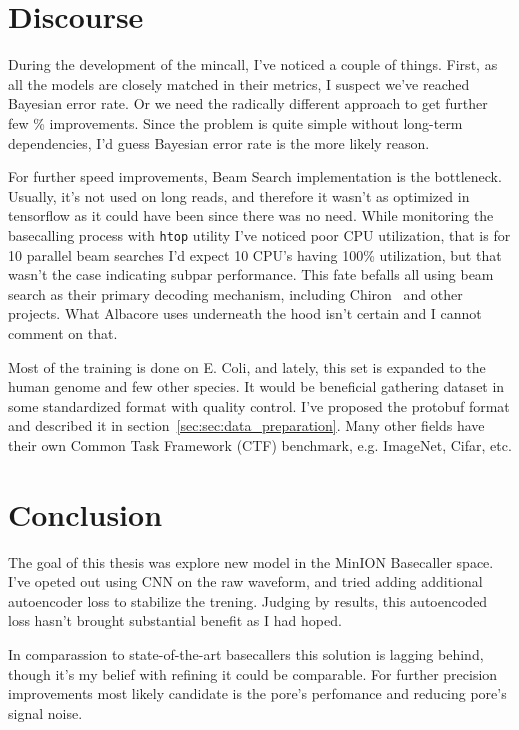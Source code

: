 \documentclass[times, utf8, diplomski, english]{fer}
\begin{document}
\chapter{Discourse}
\label{chap:discoure}
During the development of the mincall, I've noticed a couple of things. 
First, as all the models are closely matched in their metrics, I suspect we've reached Bayesian error rate. 
Or we need the radically different approach to get further few \% improvements. 
Since the problem is quite simple without long-term dependencies, I'd guess Bayesian error rate is the more likely reason.

For further speed improvements, Beam Search implementation is the bottleneck. 
Usually, it's not used on long reads, and therefore it wasn't as optimized in tensorflow as it could have been since there was no need. 
While monitoring the basecalling process with \texttt{htop} utility I've noticed poor CPU utilization, that is for 10 parallel beam searches I'd expect 10 CPU's having 100\% utilization, but that wasn't the case indicating subpar performance.
This fate befalls all using beam search as their primary decoding mechanism, including Chiron~\citep{chiron_teng} and other projects. 
What Albacore uses underneath the hood isn't certain and I cannot comment on that. 

Most of the training is done on E. Coli, and lately, this set is expanded to the human genome and few other species. 
It would be beneficial gathering dataset in some standardized format with quality control. 
I've proposed the protobuf format and described it in section~\ref{sec:sec:data_preparation}. 
Many other fields have their own Common Task Framework (CTF) benchmark, e.g. ImageNet, Cifar, etc. 
\chapter{Conclusion}
\label{chap:conslusion}

The goal of this thesis was explore new model in the MinION Basecaller space. 
I've opeted out using CNN on the raw waveform, and tried adding additional autoencoder loss to stabilize the trening. 
Judging by results, this autoencoded loss hasn't brought substantial benefit as I had hoped. 

In comparassion to state-of-the-art basecallers this solution is lagging behind, though it's my belief with refining it could be comparable.
For further precision improvements most likely candidate is the pore's perfomance and reducing pore's signal noise.
\end{document}
